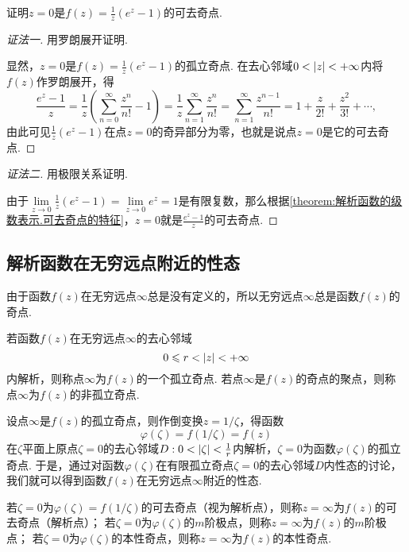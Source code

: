 \begin{example}
证明\(z=0\)是\(f(z) = \frac{1}{z} (e^z-1)\)的可去奇点.
\begin{proof}[证法一]
用罗朗展开证明.

显然，\(z=0\)是\(f(z) = \frac{1}{z} (e^z-1)\)的孤立奇点.
在去心邻域\(0<\abs{z}<+\infty\)内将\(f(z)\)作罗朗展开，得\[
\frac{e^z-1}{z}
= \frac{1}{z} \left( \sum\limits_{n=0}^{\infty} \frac{z^n}{n!} - 1 \right)
= \frac{1}{z} \sum\limits_{n=1}^{\infty} \frac{z^n}{n!}
= \sum\limits_{n=1}^{\infty} \frac{z^{n-1}}{n!}
= 1 + \frac{z}{2!} + \frac{z^2}{3!} + \dotsb,
\]由此可见\(\frac{1}{z} (e^z-1)\)在点\(z=0\)的奇异部分为零，也就是说点\(z=0\)是它的可去奇点.
\end{proof}
\begin{proof}[证法二]
用极限关系证明.

由于\(\lim\limits_{z\to0} \frac{1}{z} (e^z-1) = \lim\limits_{z\to0} e^z = 1\)是有限复数，那么根据\cref{theorem:解析函数的级数表示.可去奇点的特征}，\(z=0\)就是\(\frac{e^z-1}{z}\)的可去奇点.
\end{proof}
\end{example}

\subsection{解析函数在无穷远点附近的性态}
由于函数\(f(z)\)在无穷远点\(\infty\)总是没有定义的，所以无穷远点\(\infty\)总是函数\(f(z)\)的奇点.

\begin{definition}
若函数\(f(z)\)在无穷远点\(\infty\)的去心邻域\[
0 \leqslant r < \abs{z} < +\infty
\]内解析，则称点\(\infty\)为\(f(z)\)的一个孤立奇点.
若点\(\infty\)是\(f(z)\)的奇点的聚点，则称点\(\infty\)为\(f(z)\)的非孤立奇点.
\end{definition}

设点\(\infty\)是\(f(z)\)的孤立奇点，则作倒变换\(z = 1/\zeta\)，得函数\[
\varphi(\zeta) = f(1/\zeta) = f(z)
\]在\(\zeta\)平面上原点\(\zeta=0\)的去心邻域\(D: 0<\abs{\zeta}<\frac{1}{r}\)内解析，\(\zeta=0\)为函数\(\varphi(\zeta)\)的孤立奇点.
于是，通过对函数\(\varphi(\zeta)\)在有限孤立奇点\(\zeta=0\)的去心邻域\(D\)内性态的讨论，我们就可以得到函数\(f(z)\)在无穷远点\(\infty\)附近的性态.
\begin{definition}\label{definition:解析函数的级数表示.无穷远处孤立奇点的分类}
若\(\zeta=0\)为\(\varphi(\zeta)=f(1/\zeta)\)的可去奇点（视为解析点），则称\(z=\infty\)为\(f(z)\)的可去奇点（解析点）；
若\(\zeta=0\)为\(\varphi(\zeta)\)的\(m\)阶极点，则称\(z=\infty\)为\(f(z)\)的\(m\)阶极点；
若\(\zeta=0\)为\(\varphi(\zeta)\)的本性奇点，则称\(z=\infty\)为\(f(z)\)的本性奇点.
\end{definition}

